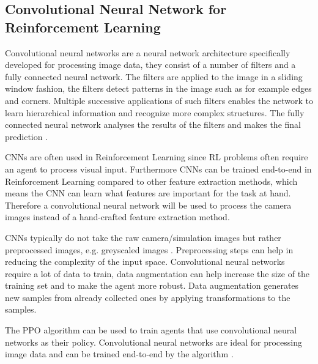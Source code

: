 



\subsection*{Convolutional Neural Network for Reinforcement Learning}

Convolutional neural networks are a neural network architecture specifically developed for processing image data, they consist of a number of filters and a fully connected neural network. The filters are applied to the image in a sliding window fashion, the filters detect patterns in the image such as for example edges and corners. Multiple successive applications of such filters enables the network to learn hierarchical information and recognize more complex structures. The fully connected neural network analyses the results of the filters and makes the final prediction \textcite{rlbook2020}.

CNNs are often used in Reinforcement Learning since RL problems often require an agent to process visual input. Furthermore CNNs can be trained end-to-end in Reinforcement Learning compared to other feature extraction methods, which means the CNN can learn what features are important for the task at hand.
Therefore a convolutional neural network will be used to process the camera images instead of a hand-crafted feature extraction method. 

CNNs typically do not take the raw camera/simulation images but rather preprocessed images, e.g. greyscaled images \textcite{atari}. Preprocessing steps can help in reducing the complexity of the input space. Convolutional neural networks require a lot of data to train, data augmentation can help increase the size of the training set and to make the agent more robust. Data augmentation generates new samples from already collected ones by applying transformations to the samples. 


The PPO algorithm can be used to train agents that use convolutional neural networks as their policy. Convolutional neural networks are ideal for processing image data and can be trained end-to-end by the algorithm \textcite{ppo}. 

